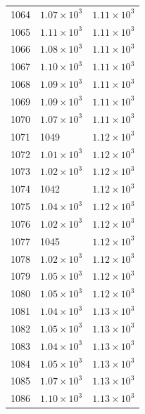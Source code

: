 \begin{table}[H]
\begin{tabular}{lll}
1064 & $\displaystyle 1.07 \times 10^{3}$ & $\displaystyle 1.11 \times 10^{3}$ \\
1065 & $\displaystyle 1.11 \times 10^{3}$ & $\displaystyle 1.11 \times 10^{3}$ \\
1066 & $\displaystyle 1.08 \times 10^{3}$ & $\displaystyle 1.11 \times 10^{3}$ \\
1067 & $\displaystyle 1.10 \times 10^{3}$ & $\displaystyle 1.11 \times 10^{3}$ \\
1068 & $\displaystyle 1.09 \times 10^{3}$ & $\displaystyle 1.11 \times 10^{3}$ \\
1069 & $\displaystyle 1.09 \times 10^{3}$ & $\displaystyle 1.11 \times 10^{3}$ \\
1070 & $\displaystyle 1.07 \times 10^{3}$ & $\displaystyle 1.11 \times 10^{3}$ \\
1071 & 1049 & $\displaystyle 1.12 \times 10^{3}$ \\
1072 & $\displaystyle 1.01 \times 10^{3}$ & $\displaystyle 1.12 \times 10^{3}$ \\
1073 & $\displaystyle 1.02 \times 10^{3}$ & $\displaystyle 1.12 \times 10^{3}$ \\
1074 & 1042 & $\displaystyle 1.12 \times 10^{3}$ \\
1075 & $\displaystyle 1.04 \times 10^{3}$ & $\displaystyle 1.12 \times 10^{3}$ \\
1076 & $\displaystyle 1.02 \times 10^{3}$ & $\displaystyle 1.12 \times 10^{3}$ \\
1077 & 1045 & $\displaystyle 1.12 \times 10^{3}$ \\
1078 & $\displaystyle 1.02 \times 10^{3}$ & $\displaystyle 1.12 \times 10^{3}$ \\
1079 & $\displaystyle 1.05 \times 10^{3}$ & $\displaystyle 1.12 \times 10^{3}$ \\
1080 & $\displaystyle 1.05 \times 10^{3}$ & $\displaystyle 1.12 \times 10^{3}$ \\
1081 & $\displaystyle 1.04 \times 10^{3}$ & $\displaystyle 1.13 \times 10^{3}$ \\
1082 & $\displaystyle 1.05 \times 10^{3}$ & $\displaystyle 1.13 \times 10^{3}$ \\
1083 & $\displaystyle 1.04 \times 10^{3}$ & $\displaystyle 1.13 \times 10^{3}$ \\
1084 & $\displaystyle 1.05 \times 10^{3}$ & $\displaystyle 1.13 \times 10^{3}$ \\
1085 & $\displaystyle 1.07 \times 10^{3}$ & $\displaystyle 1.13 \times 10^{3}$ \\
1086 & $\displaystyle 1.10 \times 10^{3}$ & $\displaystyle 1.13 \times 10^{3}$ \\

\end{tabular}
\end{table}
